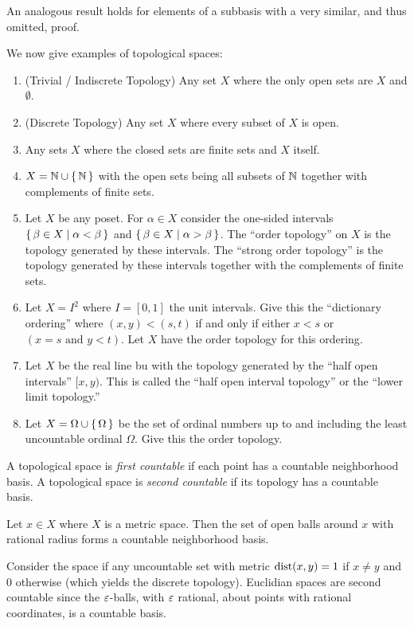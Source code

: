 \documentclass[letterpaper, 11pt, oneside]{book}
\begin{document}
An analogous result holds for elements of a subbasis with a very similar, and thus omitted, proof.

\begin{ex}
  We now give examples of topological spaces:
  \begin{enumerate}
  \item (Trivial / Indiscrete Topology) Any set $X$ where the only open sets are $X$ and $\emptyset$.
  \item (Discrete Topology) Any set $X$ where every subset of $X$ is open.
  \item Any sets $X$ where the closed sets are finite sets and $X$ itself.
  \item $X = \mathbb{N} \cup \set{\mathbb{N}}$ with the open sets being all subsets of $\mathbb{N}$ together with complements of finite sets.
  \item Let $X$ be any poset.
        For $\alpha \in X$ consider the one-sided intervals $\set{\beta \in X | \alpha < \beta}$ and $\set{\beta \in X | \alpha > \beta}$.
        The ``order topology'' on $X$ is the topology generated by these intervals.
        The ``strong order topology'' is the topology generated by these intervals together with the complements of finite sets.
  \item Let $X = I^{2}$ where $I = [0, 1]$ the unit intervals.
        Give this the ``dictionary ordering'' where $(x, y) < (s, t)$ if and only if either $x < s$ or $(x = s \text{ and } y < t)$.
        Let $X$ have the order topology for this ordering.
  \item Let $X$ be the real line bu with the topology generated by the ``half open intervals'' $[x, y)$.
        This is called the ``half open interval topology'' or the ``lower limit topology.''
  \item Let $X = \Omega \cup \set{\Omega}$ be the set of ordinal numbers up to and including the least uncountable ordinal $\Omega$.
        Give this the order topology.
  \end{enumerate}
\end{ex}

\begin{defn}[Countability]
  A topological space is \emph{first countable} if each point has a countable neighborhood basis.
  A topological space is \emph{second countable} if its topology has a countable basis.
\end{defn}

\clearpage

\begin{ex}
  Let $x \in X$ where $X$ is a metric space.
  Then the set of open balls around $x$ with rational radius forms a countable neighborhood basis.

  Consider the space if any uncountable set with metric $\operatorname{dist}(x, y) = 1$ if $x \neq y$ and $0$ otherwise (which yields the discrete topology).
  Euclidian spaces are second countable since the $\varepsilon$-balls, with $\varepsilon$ rational, about points with rational coordinates, is a countable basis.
\end{ex}
\end{document}
